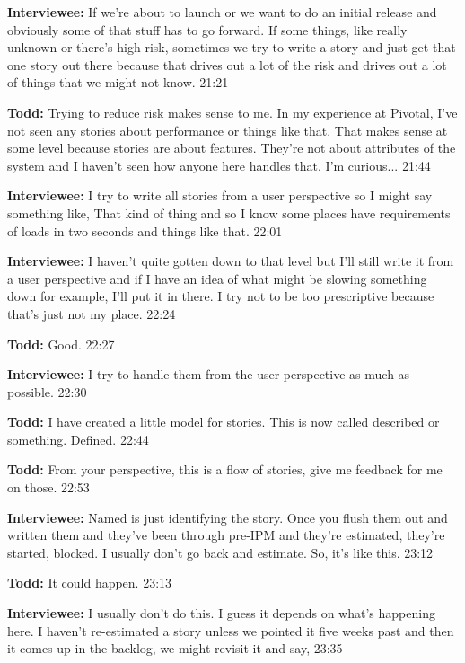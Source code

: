 \textbf{Interviewee:} If we're about to launch or we want to do an initial release and obviously some of that stuff has to go forward. If some things, like really unknown or there's high risk, sometimes we try to write a story and just get that one story out there because that drives out a lot of the risk and drives out a lot of things that we might not know. 21:21

\textbf{Todd:} Trying to reduce risk makes sense to me. In my experience at Pivotal, I've not seen any stories about performance or things like that. That makes sense at some level because stories are about features. They're not about attributes of the system and I haven't seen how anyone here handles that. I'm curious... 21:44

\textbf{Interviewee:} I try to write all stories from a user perspective so I might say something like,  That kind of thing and so I know some places have requirements of loads in two seconds and things like that. 22:01

\textbf{Interviewee:} I haven't quite gotten down to that level but I'll still write it from a user perspective and if I have an idea of what might be slowing something down for example, I'll put it in there.  I try not to be too prescriptive because that's just not my place. 22:24

\textbf{Todd:} Good. 22:27

\textbf{Interviewee:} I try to handle them from the user perspective as much as possible. 22:30

\textbf{Todd:} I have created a little model for stories. This is now called described or something. Defined. 22:44

\textbf{Todd:} From your perspective, this is a flow of stories, give me feedback for me on those. 22:53

\textbf{Interviewee:} Named is just identifying the story. Once you flush them out and written them and they've been through pre-IPM and they're estimated, they're started, blocked. I usually don't go back and estimate. So, it's like this. 23:12

\textbf{Todd:} It could happen. 23:13

\textbf{Interviewee:} I usually don't do this. I guess it depends on what's happening here. I haven't re-estimated a story unless we pointed it five weeks past and then it comes up in the backlog, we might revisit it and say,  23:35

